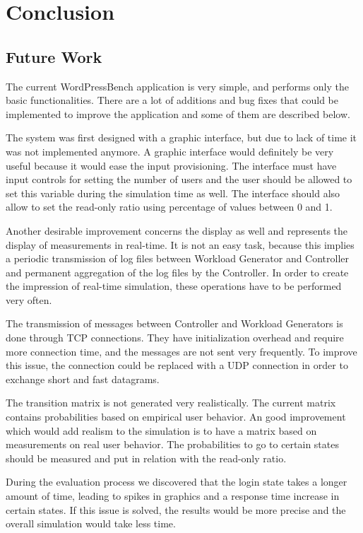 \chapter{Conclusion}
\label{chapter:chapter6}

\section{Future Work}
\label{sec:future-work}

The current WordPressBench application is very simple, and performs only the basic functionalities. There are a lot of additions and bug fixes that could be implemented to improve the application and some of them are described below.

The system was first designed with a graphic interface, but due to lack of time it was not implemented anymore. A graphic interface would definitely be very useful because it would ease the input provisioning. The interface must have input controls for setting the number of users and the user should be allowed to set this variable during the simulation time as well. The interface should also allow to set the read-only ratio using percentage of values between 0 and 1.

Another desirable improvement concerns the display as well and represents the display of measurements in real-time. It is not an easy task, because this implies a periodic transmission of log files between Workload Generator and Controller and permanent aggregation of the log files by the Controller. In order to create the impression of real-time simulation, these operations have to be performed very often.

The transmission of messages between Controller and Workload Generators is done through TCP connections. They have initialization overhead and require more connection time, and the messages are not sent very frequently. To improve this issue, the connection could be replaced with a UDP connection in order to exchange short and fast datagrams.

The transition matrix is not generated very realistically. The current matrix contains probabilities based on empirical user behavior. An good improvement which would add realism to the simulation is to have a matrix based on measurements on real user behavior. The probabilities to go to certain states should be measured and put in relation with the read-only ratio.

During the evaluation process we discovered that the login state takes a longer amount of time, leading to spikes in graphics and a response time increase in certain states. If this issue is solved, the results would be more precise and the overall simulation would take less time.

